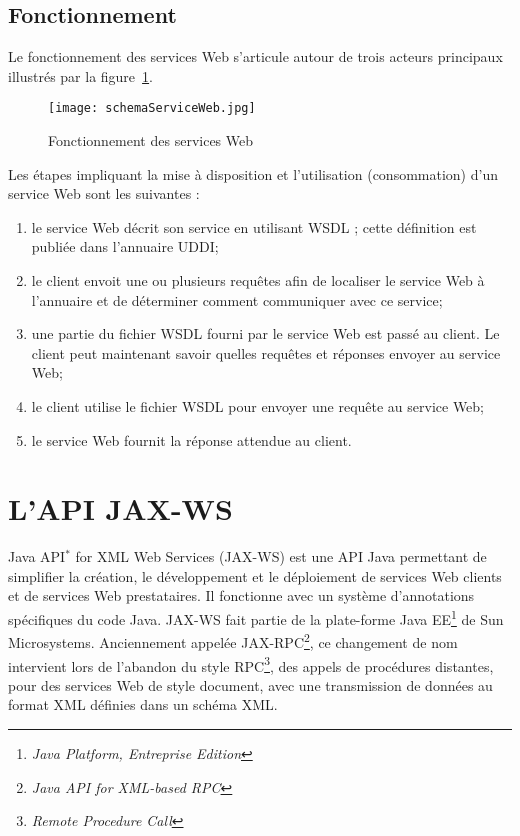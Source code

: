 \subsection{Fonctionnement}

Le fonctionnement des services Web s'articule autour de trois acteurs principaux illustr\'es par la figure~\ref{figure:schemaServiceWeb}.

\begin{figure}[!ht]
	\centering
	\texttt{[image: schemaServiceWeb.jpg]}
	\caption{Fonctionnement des services Web}
	\label{figure:schemaServiceWeb}

\end{figure}

Les \'etapes impliquant la mise \`a disposition et l'utilisation (consommation) d'un service Web sont les suivantes :

\begin{enumerate}
	\item le service Web d\'ecrit son service en utilisant WSDL ; cette d\'efinition est publi\'ee dans l'annuaire UDDI;
	\item le client envoit une ou plusieurs requ\^etes afin de localiser le service Web \`a l'annuaire et de d\'eterminer comment communiquer avec ce service;
	\item une partie du fichier WSDL fourni par le service Web est pass\'e au client. 
	Le client peut maintenant savoir quelles requ\^etes et r\'eponses envoyer au service Web;
	\item le client utilise le fichier WSDL pour envoyer une requ\^ete au service Web;
	\item le service Web fournit la r\'eponse attendue au client.

\end{enumerate}

\section{L'API JAX-WS}

Java API$^*$ for XML Web Services (JAX-WS) est une API Java permettant de simplifier la cr\'eation, le d\'eveloppement et le d\'eploiement de services Web clients et de services Web prestataires.
Il fonctionne avec un syst\`eme d'annotations sp\'ecifiques du code Java.
JAX-WS fait partie de la plate-forme Java EE\protect\footnote{\textit{Java Platform, Entreprise Edition}} de Sun Microsystems.
Anciennement appel\'ee JAX-RPC\protect\footnote{\textit{Java API for XML-based RPC}}, ce changement de nom intervient lors de l'abandon du style RPC\protect\footnote{\textit{Remote Procedure Call}}, des appels de proc\'edures distantes, pour des services Web de style document, avec une transmission de donn\'ees au format XML d\'efinies dans un sch\'ema XML.

